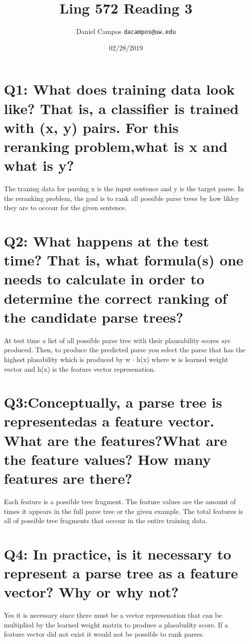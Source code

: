 \documentclass[11pt]{article}
\begin{document}
\title{Ling 572 Reading 3}
\author{Daniel Campos  \tt {dacampos@uw.edu}}
\date{02/28/2019}
\maketitle 
\section{ Q1: What does training data look like? That is, a classifier is trained with (x, y) pairs. For this reranking problem,what is x and what is y?   }
The traning data for parsing x is the input sentence and y is the target parse. In the reranking problem, the goal is to rank all possible parse trees by how likley they are to occour for the given sentence.
\section{ Q2: What happens at the test time? That is, what formula(s) one needs to calculate in order to determine the correct ranking of the candidate parse trees?}
At test time a list of all possible parse tree with their plausability scores are produced. Then, to produce the predicted parse you select the parse that has the highest plasability which is produced by w $\cdot$ h(x) where w is learned weight vector and h(x) is the feature vector represenation.
\section{ Q3:Conceptually, a parse tree is representedas a feature vector. What are the features?What are the feature values? How many features are there?}
Each feature is a possible tree fragment. The feature values are the amount of times it appears in the full parse tree or the given example. The total features is all of possible tree fragments that occour in the entire training data.
\section{Q4: In practice, is it necessary to represent a parse tree as a feature vector? Why or why not?}
Yes it is necessary since there must be a vector represenation that can be multiplied by the learned weight matrix to produce a plasabulity score. If a feature vector did not exist it would not be possible to rank parses.
\end{document}
